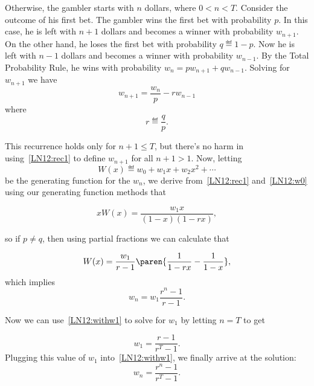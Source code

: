 \begin{example}
Otherwise, the gambler starts with $n$ dollars, where $0 < n < T$.
Consider the outcome of his first bet.  The gambler wins the first bet
with probability $p$.  In this case, he is left with $n+1$ dollars and
becomes a winner with probability $w_{n+1}$.  On the other hand, he loses
the first bet with probability $q \eqdef 1-p$.  Now he is left with $n-1$
dollars and becomes a winner with probability $w_{n-1}$.  By the Total
Probability Rule, he wins with probability $w_n = p w_{n+1} + q w_{n-1}$.
Solving for $w_{n+1}$ we have
\begin{equation}\label{LN12:rec1}
w_{n+1} = \frac{w_n}{p} -r w_{n-1}
\end{equation}
where
\[
r \eqdef \frac{q}{p}.
\]

This recurrence holds only for $n+1 \leq T$, but there's no harm in
using~\eqref{LN12:rec1} to define $w_{n+1}$ for all $n+1 >1$.  Now, letting
\[
W(x) \eqdef w_0 + w_1x + w_2x^2 + \cdots
\]
be the generating function for the $w_n$, we derive from~\eqref{LN12:rec1}
and~\eqref{LN12:w0} using our generating function methods that

\begin{equation}\label{LN12:Wx}
xW(x) = \frac{w_1x}{(1-x)(1-rx)},
\end{equation}

so if $p \neq q$, then using partial fractions we can calculate that

\[
W(x) = \frac{w_1}{r-1} \paren{\frac{1}{1-rx} - \frac{1}{1-x}},
\]
which implies
\begin{equation}\label{LN12:withw1}
w_n = w_1\frac{r^n - 1}{r-1}.
\end{equation}

Now we can use~\eqref{LN12:withw1} to solve for $w_1$ by letting $n=T$ to get

\[
w_1= \frac{r - 1}{r^T-1}.
\]
Plugging this value of $w_1$ into~\eqref{LN12:withw1}, we finally arrive at
the solution:
\begin{equation}\label{LN12:wnsol}
w_n = \frac{r^n-1}{r^T -1}. 
\end{equation}


\end{example}
